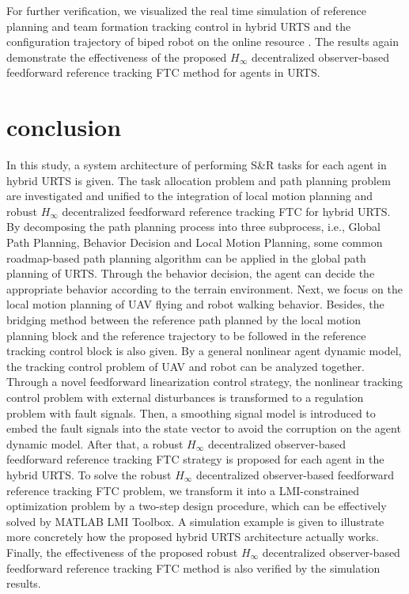 \documentclass[journal,12pt,onecolumn,draftclsnofoot,]{IEEEtran}
\begin{document}
For further verification, we visualized the real time simulation of reference planning and team formation tracking control in hybrid URTS and the configuration trajectory of biped robot on the online resource \cite{mySimulation}. The results again demonstrate the effectiveness of the proposed $H_\infty$ decentralized observer-based feedforward reference tracking FTC method for agents in URTS.

\section{conclusion}
In this study, a system architecture of performing S\&R tasks for each agent in hybrid URTS is given. The task allocation problem and path planning problem are investigated and unified to the integration of local motion planning and robust $H_\infty$ decentralized feedforward reference tracking FTC for hybrid URTS. By decomposing the path planning process into three subprocess, i.e., Global Path Planning, Behavior Decision and Local Motion Planning, some common roadmap-based path planning algorithm can be applied in the global path planning of URTS. Through the behavior decision, the agent can decide the appropriate behavior according to the terrain environment. Next, we focus on the local motion planning of UAV flying and robot walking behavior. Besides, the bridging method between the reference path planned by the local motion planning block and the reference trajectory to be followed in the reference tracking control block is also given. By a general nonlinear agent dynamic model, the tracking control problem of UAV and robot can be analyzed together. Through a novel feedforward linearization control strategy, the nonlinear tracking control problem with external disturbances is transformed to a regulation problem with fault signals. Then, a smoothing signal model is introduced to embed the fault signals into the state vector to avoid the corruption on the agent dynamic model. After that, a robust $H_\infty$ decentralized observer-based feedforward reference tracking FTC strategy is proposed for each agent in the hybrid URTS. To solve the robust $H_\infty$ decentralized observer-based feedforward reference tracking FTC problem, we transform it into a LMI-constrained optimization problem by a two-step design procedure, which can be effectively solved by MATLAB LMI Toolbox. A simulation example is given to illustrate more concretely how the proposed hybrid URTS architecture actually works. Finally, the effectiveness of the proposed robust $H_\infty$ decentralized observer-based feedforward reference tracking FTC method is also verified by the simulation results.



\end{document}

